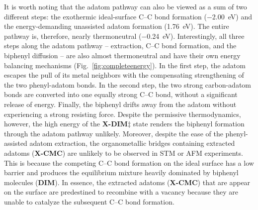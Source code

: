 \documentclass[aps,prb,amsmath,amssymb,11pt]{revtex4-1}
\newcommand{\zhzh}{\color{black}}
\renewcommand{\sout}[1]{\unskip}
\begin{document}
It is worth noting that the adatom pathway can also be viewed as a sum of two different steps: the exothermic ideal-surface C--C bond formation (\SI{-2.00}{\electronvolt}) and the energy-demanding {\zhzh unassisted adatom formation} \sout{adatom extraction on clean surface} (\SI{1.76}{\electronvolt}). 
The entire pathway is, therefore, nearly thermoneutral (\SI{-0.24}{\electronvolt}). 
Interestingly, \sout{however,} all three steps along the adatom pathway -- extraction, C--C bond
formation, and the biphenyl diffusion -- are also almost thermoneutral {\zhzh and have} \sout{, with} their own energy balancing mechanisms (Fig.~\ref{fig:completeenergy}). 
In the first step, the adatom escapes the pull of its metal neighbors with the compensating strengthening of the two phenyl-adatom bonds. In the second step, the {\zhzh two} strong carbon-adatom bonds are converted into \sout{the} {\zhzh one} equally strong C--C bond, without a significant release of energy. Finally, the biphenyl drifts away from the adatom without experiencing a strong resisting force. Despite the permissive thermodynamics, however, the high energy of the \sout{transition state in the C--C bond formation step (} \textbf{X-DIM$\ddagger$} \sout{)} {\zhzh state} renders the biphenyl formation through the \sout{extracted} adatom pathway unlikely.
Moreover, \sout{even with the surprising} {\zhzh despite the} ease of the phenyl-assisted adatom extraction, the organometallic bridges containing extracted adatoms (\textbf{X-CMC}) are unlikely to be observed in STM or AFM experiments. This is because \sout{the small fraction of the \textbf{CMC} organometallic bridges that get converted to \textbf{X-CMC} are unable to catalyze the further C--C bond formation and predestined to recombine with the vacancy. In contrast,} the competing C--C bond formation on the ideal surface \sout{is essentially irreversible, producing} {\zhzh has a low barrier and produces} the equilibrium mixture heavily dominated by \sout{ideal-surface} biphenyl molecules {\zhzh (\textbf{DIM})}. {\zhzh In essence, the extracted adatoms (\textbf{X-CMC}) that are appear on the surface are predestined to recombine with a vacancy because they are unable to catalyze the subsequent C--C bond formation.}
\end{document}
